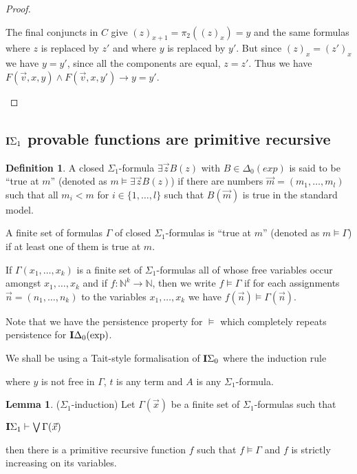 \documentclass[8pt]{article}
\theoremstyle{definition}
\newtheorem{definition}{Definition}[section]
\theoremstyle{definition}
\theoremstyle{definition}
\theoremstyle{definition}
\theoremstyle{definition}
\theoremstyle{definition}
\theoremstyle{definition}
\theoremstyle{definition}
\newtheorem{lemma}{Lemma}[section]
\theoremstyle{definition}
\theoremstyle{definition}
\theoremstyle{definition}
\theoremstyle{definition}
\theoremstyle{definition}
\theoremstyle{question}
\begin{document}
\begin{proof}
\begin{enumerate}
\begin{enumerate}
    The final conjuncts in $C$ give $(z)_{x + 1} = \pi_2((z)_x) = y$ and the same formulas where $z$ is replaced by $z'$ 
    and where $y$ is replaced by $y'$. But since $(z)_x = (z')_x$ we have $y = y'$, since all the components are equal,
    $z = z'$. Thus we have $F(\vec{v}, x, y) \land F(\vec{v}, x, y') \to y = y'$.
  \end{enumerate}
  \end{enumerate}
\end{proof}

\subsection{${\bf I}\Sigma_1$ provable functions are primitive recursive}

\begin{definition}
  A closed $\Sigma_1$-formula $\exists \vec{z} B(z)$ with $B \in \Delta_0(exp)$ is said to be
  ``true at $m$'' (denoted as $m \models \exists \vec{z} B(z)$) if there are numbers
  $\vec{m} = (m_1, \dots, m_l)$ such that all $m_i < m$ for $i \in \{1, \dots, l\}$
  such that $B(\vec{m})$ is true in the standard model.
  
  A finite set of formulas $\Gamma$ of closed $\Sigma_1$-formulas is ``true at $m$'' 
  (denoted as $m \models \Gamma$) if at least one of them is true at $m$.

  If $\Gamma(x_1, \dots, x_k)$ is a finite set of $\Sigma_1$-formulas all of whose
  free variables occur amongst $x_1, \dots, x_k$ and if $f : \mathbb{N}^k \to \mathbb{N}$, then we write 
  $f \models \Gamma$ if for each assignments $\vec{n} = (n_1, \dots, n_k)$ to the variables  $x_1, \dots, x_k$
  we have $f(\vec{n}) \models \Gamma(\vec{n})$.
\end{definition}

Note that we have the persistence property for $\models$ 
which completely repeats persistence for ${\bf I}\Delta_0(\operatorname{exp})$.

We shall be using a Tait-style formalisation of ${\bf I}\Sigma_0$ where the induction rule

\begin{prooftree}
\end{prooftree}

where $y$ is not free in $\Gamma$, $t$ is any term and $A$ is any $\Sigma_1$-formula.

\begin{lemma} ($\Sigma_1$-induction)
  Let $\Gamma(\vec{x})$ be a finite set of $\Sigma_1$-formulas such that
  \begin{center}
    ${\bf I}\Sigma_1 \vdash \bigvee \Gamma(\vec{x})$
  \end{center}
  then there is a primitive recursive function $f$ such that $f \models \Gamma$ and $f$ is strictly increasing
  on its variables.
\end{lemma}
\end{document}
